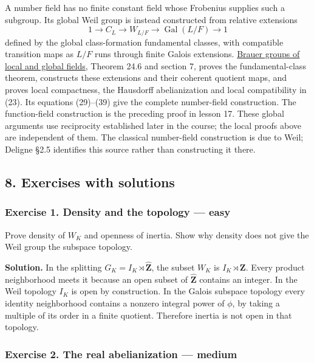 \documentclass[11pt,a4paper]{article}
\begin{document}
A number field has no finite constant field whose Frobenius supplies
such a subgroup. Its global Weil group is instead constructed from
relative extensions \[
1\longrightarrow C_L\longrightarrow W_{L/F}
 \longrightarrow\operatorname{Gal}(L/F)\longrightarrow1
\tag{24}
\] defined by the global class-formation fundamental classes, with
compatible transition maps as \(L/F\) runs through finite Galois
extensions.
\href{../brauer-groups-of-local-and-global-fields.html}{Brauer groups of
local and global fields}, Theorem 24.6 and section 7, proves the
fundamental-class theorem, constructs these extensions and their
coherent quotient maps, and proves local compactness, the Hausdorff
abelianization and local compatibility in (23). Its equations (29)--(39)
give the complete number-field construction. The function-field
construction is the preceding proof in lesson 17. These global arguments
use reciprocity established later in the course; the local proofs above
are independent of them. The classical number-field construction is due
to Weil; Deligne §2.5 identifies this source rather than constructing it
there.

\subsection{8. Exercises with solutions}\label{exercises-with-solutions}

\subsubsection{Exercise 1. Density and the topology ---
easy}\label{exercise-1.-density-and-the-topology-easy}

Prove density of \(W_K\) and openness of inertia. Show why density does
not give the Weil group the subspace topology.

\textbf{Solution.} In the splitting
\(G_K=I_K\rtimes\widehat{\mathbf Z}\), the subset \(W_K\) is
\(I_K\rtimes\mathbf Z\). Every product neighborhood meets it because an
open subset of \(\widehat{\mathbf Z}\) contains an integer. In the Weil
topology \(I_K\) is open by construction. In the Galois subspace
topology every identity neighborhood contains a nonzero integral power
of \(\phi\), by taking a multiple of its order in a finite quotient.
Therefore inertia is not open in that topology.

\subsubsection{Exercise 2. The real abelianization ---
medium}\label{exercise-2.-the-real-abelianization-medium}
\end{document}
